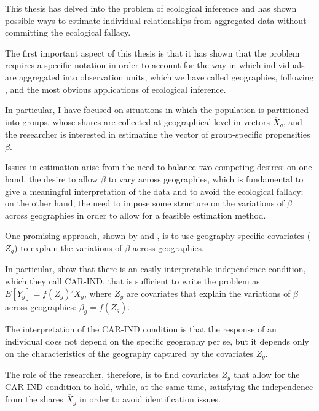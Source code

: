 This thesis has delved into the problem of ecological inference and has shown possible ways to estimate individual relationships from aggregated data without committing the ecological fallacy.

The first important aspect of this thesis is that it has shown that the problem requires a specific notation in order to account for the way in which individuals are aggregated into observation units, which we have called geographies, following \citet{kuriwaki2026roleconfounderslinearityecological}, \citet{mccartan2025identificationsemiparametricestimationconditional} and the most obvious applications of ecological inference.

In particular, I have focused on situations in which the population is partitioned into groups, whose shares are collected at geographical level in vectors $\overline{X}_g$, and the researcher is interested in estimating the vector of group-specific propensities $\beta$.

Issues in estimation arise from the need to balance two competing desires: on one hand, the desire to allow $\beta$ to vary across geographies, which is fundamental to give a meaningful interpretation of the data and to avoid the ecological fallacy; on the other hand, the need to impose some structure on the variations of $\beta$ across geographies in order to allow for a feasible estimation method.

One promising approach, shown by \citet{kuriwaki2026roleconfounderslinearityecological} and \citet{mccartan2025identificationsemiparametricestimationconditional}, is to use geography-specific covariates ($Z_g$) to explain the variations of $\beta$ across geographies.

In particular, \citet{mccartan2025identificationsemiparametricestimationconditional} show that there is an easily interpretable independence condition, which they call CAR-IND, that is sufficient to write the problem as $E[Y_g] = f(Z_g)'\overline{X}_g$, where $Z_g$ are covariates that explain the variations of $\beta$ across geographies: $\beta_g = f(Z_g)$.

The interpretation of the CAR-IND condition is that the response of an individual does not depend on the specific geography per se, but it depends only on the characteristics of the geography captured by the covariates $Z_g$.

The role of the researcher, therefore, is to find covariates $Z_g$ that allow for the CAR-IND condition to hold, while, at the same time, satisfying the independence from the shares $\overline{X}_g$ in order to avoid identification issues.


